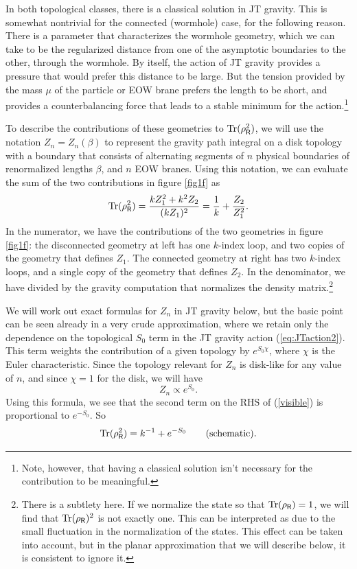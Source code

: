 \documentclass[12pt]{article}
\newcommand{\be}{\begin{equation}}
\newcommand{\ee}{\end{equation}}
\numberwithin{equation}{section}
\def\tr{\text{Tr}}
\begin{document}
In both topological classes, there is a classical solution in JT gravity. This is somewhat nontrivial for the connected (wormhole) case, for the following reason. There is a parameter that characterizes the wormhole geometry, which we can take to be the regularized distance from one of the asymptotic boundaries to the other, through the wormhole. By itself, the action of JT gravity provides a pressure that would prefer this distance to be large. But the tension provided by the mass $\mu$ of the particle or EOW brane prefers the length to be short, and provides a counterbalancing force that leads to a stable minimum for the action.\footnote{Note, however, that having a classical solution isn't necessary for the contribution to be meaningful.}

To describe the contributions of these geometries to $\tr(\rho_{\sf{R}}^2)$, we will use the notation $Z_n = Z_n(\beta)$ to represent the gravity path integral on a disk topology with a boundary that consists of alternating segments of $n$ physical boundaries of renormalized lengths $\beta$, and $n$ EOW branes. Using this notation, we can evaluate the sum of the two contributions in figure \ref{fig1f} as
\be
\tr(\rho_{\sf{R}}^2) =  \frac{kZ_1^2 + k^2Z_2}{(k Z_1)^2} = \frac{1}{k} + \frac{Z_2}{Z_1^2}.\label{visible}
\ee
In the numerator, we have the contributions of the two geometries in figure \ref{fig1f}: the disconnected geometry at left has one $k$-index loop, and two copies of the geometry that defines $Z_1$. The connected geometry at right has two $k$-index loops, and a single copy of the geometry that defines $Z_2$. In the denominator, we have divided by the gravity computation that normalizes the density matrix.\footnote{There is a subtlety here. If we normalize the state so that $\tr(\rho_{\sf{R}}) = 1$, we will find that $\tr(\rho_{\sf{R}})^2$ is not exactly one. This can be interpreted as due to the small fluctuation in the normalization of the states. This effect can be taken into account, but in the planar approximation that we will describe below, it is consistent to ignore it.}

We will work out exact formulas for $Z_n$ in JT gravity below, but the basic point can be seen already in a very crude approximation, where we retain only the dependence on the topological $S_0$ term in the JT gravity action (\ref{eq:JTaction2}). This term weights the contribution of a given topology by $e^{S_0\chi}$, where $\chi$ is the Euler characteristic. Since the topology relevant for $Z_n$ is disk-like for any value of $n$, and since $\chi = 1$ for the disk, we will have
\be
Z_n \propto e^{S_0}.\label{s0}
\ee
Using this formula, we see that the second term on the RHS of (\ref{visible}) is proportional to $e^{-S_0}$. So
\be
\tr(\rho_{\sf{R}}^2) = k^{-1} + e^{-S_0} \hspace{20pt} \text{(schematic)}.
\ee
\end{document}
